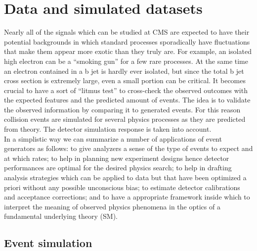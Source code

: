 \chapter{Data and simulated datasets} \label{Chapter4} 


Nearly all of the signals which can be studied at CMS are
expected to have their potential backgrounds in which standard
processes sporadically have fluctuations that make them appear more exotic than they truly are.
For example, an isolated high \pt electron can be a ``smoking gun'' for
a few rare processes. At the same time an electron contained in a b
jet is hardly ever isolated, but since the total b jet cross section
is extremely large, even a small portion can be critical. It becomes
crucial to have a sort of ``litmus test'' to cross-check the observed
outcomes with the expected features and the predicted amount of events.
The idea is to validate the observed information by comparing it to
generated events. For this reason collision events are simulated for
several physics processes as they are predicted from theory. The
detector simulation response is taken into account. \\
In a simplistic way we can summarize a number of applications of event
generators as follows: to give analyzers a sense of the type of
events to expect and at which rates; to help in planning new
experiment designs hence detector performances are optimal for the
desired physics search; to help in drafting analysis strategies which
can be applied to data but that have been optimized a priori without
any possible unconscious bias; to estimate detector calibrations and acceptance
corrections; and to have a appropriate framework inside which to
interpret the meaning of observed physics phenomena in the optics of a
fundamental underlying theory (SM).



\section{Event simulation}\label{sec:c4eventsimulation}

